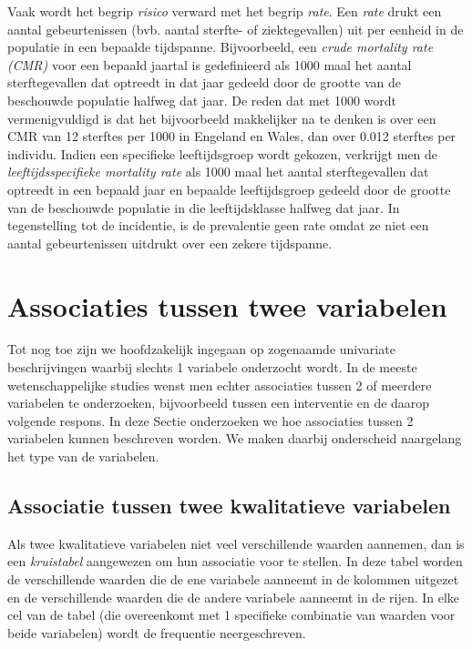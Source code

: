 \documentclass[
  12pt,dutch]{book}
\theoremstyle{definition}
\theoremstyle{definition}
\theoremstyle{definition}
\theoremstyle{definition}
\theoremstyle{remark}
\begin{document}
Vaak wordt het begrip \emph{risico} verward met het begrip \emph{rate}. Een
\emph{rate} drukt een aantal gebeurtenissen (bvb. aantal sterfte- of
ziektegevallen) uit per eenheid in de populatie in een bepaalde tijdspanne.
Bijvoorbeeld, een \emph{crude mortality rate (CMR)} voor een bepaald
jaartal is gedefinieerd als 1000 maal het aantal sterftegevallen dat
optreedt in dat jaar gedeeld door de grootte van de beschouwde populatie
halfweg dat jaar. De reden dat met 1000 wordt vermenigvuldigd is dat het
bijvoorbeeld makkelijker na te denken is over een CMR van 12 sterftes per
1000 in Engeland en Wales, dan over 0.012 sterftes per individu. Indien een
specifieke leeftijdsgroep wordt gekozen, verkrijgt men de \emph{leeftijdsspecifieke mortality rate} als 1000 maal het aantal sterftegevallen
dat optreedt in een bepaald jaar en bepaalde leeftijdsgroep gedeeld door de
grootte van de beschouwde populatie in die leeftijdsklasse halfweg dat jaar.
In tegenstelling tot de incidentie, is de prevalentie geen rate omdat ze
niet een aantal gebeurtenissen uitdrukt over een zekere tijdspanne.

\section{Associaties tussen twee variabelen}\label{associaties-tussen-twee-variabelen}

Tot nog toe zijn we hoofdzakelijk ingegaan op zogenaamde univariate beschrijvingen waarbij slechts 1 variabele onderzocht wordt. In de meeste wetenschappelijke studies wenst men echter associaties tussen 2 of meerdere variabelen te onderzoeken, bijvoorbeeld tussen een interventie en de daarop volgende respons. In deze Sectie onderzoeken we hoe associaties tussen 2 variabelen kunnen beschreven worden. We maken daarbij onderscheid naargelang het type van de variabelen.

\subsection{Associatie tussen twee kwalitatieve variabelen}\label{subsec:kruistabel}

Als twee kwalitatieve variabelen niet veel verschillende waarden aannemen,
dan is een \emph{kruistabel} aangewezen om hun associatie voor te stellen.
In deze tabel worden de verschillende waarden die de ene variabele aanneemt
in de kolommen uitgezet en de verschillende waarden die de andere variabele
aanneemt in de rijen. In elke cel van de tabel (die overeenkomt met 1
specifieke combinatie van waarden voor beide variabelen) wordt de frequentie
neergeschreven.
\end{document}
